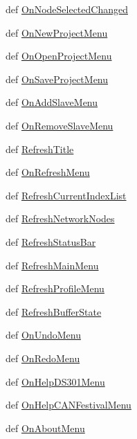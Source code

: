 \begin{CompactItemize}
\item 
def \hyperlink{namespacenetworkedit_5998cd277c097979131afcdda5f39464}{On\-Node\-Selected\-Changed}
\item 
def \hyperlink{namespacenetworkedit_900ce0c234a0cb0b051e23780999e052}{On\-New\-Project\-Menu}
\item 
def \hyperlink{namespacenetworkedit_7ffb18f26bd0a019c59e9402373b904e}{On\-Open\-Project\-Menu}
\item 
def \hyperlink{namespacenetworkedit_38a5bbe86087f2d696bcd53f922d6450}{On\-Save\-Project\-Menu}
\item 
def \hyperlink{namespacenetworkedit_4ff91dd5ec49b8435fc4871ad91cc150}{On\-Add\-Slave\-Menu}
\item 
def \hyperlink{namespacenetworkedit_3c3acc2994f8e2230cef333585c6354f}{On\-Remove\-Slave\-Menu}
\item 
def \hyperlink{namespacenetworkedit_84786509128cc13e6e1135aadac688ac}{Refresh\-Title}
\item 
def \hyperlink{namespacenetworkedit_ef988c30a20345badf3ab9b7fb3577ab}{On\-Refresh\-Menu}
\item 
def \hyperlink{namespacenetworkedit_6d8b2e2a672b5c89f1cef538d21517c4}{Refresh\-Current\-Index\-List}
\item 
def \hyperlink{namespacenetworkedit_81036ca384b8cf75d0010851755d8317}{Refresh\-Network\-Nodes}
\item 
def \hyperlink{namespacenetworkedit_1fa2b2fd11d7a6dc830586a45eee2464}{Refresh\-Status\-Bar}
\item 
def \hyperlink{namespacenetworkedit_f35165c7e88dca205c83933033dff40d}{Refresh\-Main\-Menu}
\item 
def \hyperlink{namespacenetworkedit_16a1bfa553c27346c1afa95283839ff0}{Refresh\-Profile\-Menu}
\item 
def \hyperlink{namespacenetworkedit_74f3ac94488160a26836197de52b9fd2}{Refresh\-Buffer\-State}
\item 
def \hyperlink{namespacenetworkedit_f5979f3a6d283393fb5a68ab22934abb}{On\-Undo\-Menu}
\item 
def \hyperlink{namespacenetworkedit_dd170a72c3140d1508f621922d3c54df}{On\-Redo\-Menu}
\item 
def \hyperlink{namespacenetworkedit_a41a7f8c80dcf62ea786deda026be61e}{On\-Help\-DS301Menu}
\item 
def \hyperlink{namespacenetworkedit_93a70d630ce5859be11aef8d8d946422}{On\-Help\-CANFestival\-Menu}
\item 
def \hyperlink{namespacenetworkedit_c5778c6a10ff341bd15264380d24fa42}{On\-About\-Menu}

\end{CompactItemize}
